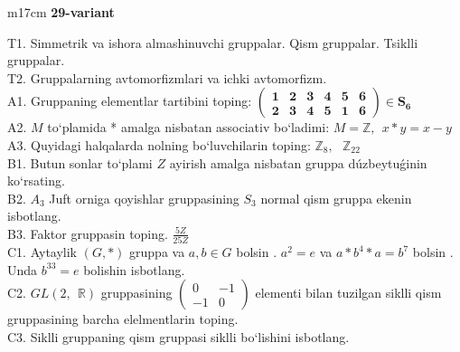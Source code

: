\documentclass{article}
\begin{document}
\begin{tabular}{m{17cm}}
\textbf{29-variant}
\newline

T1. Simmetrik va ishora almashinuvchi gruppalar. Qism gruppalar. Tsiklli gruppalar. \\
T2. Gruppalarning avtomorfizmlari va ichki avtomorfizm. \\
A1. Gruppaning elementlar tartibini toping: \(\begin{pmatrix}
\mathbf{1} & \mathbf{2} & \mathbf{3} & \mathbf{4} & \mathbf{5} & \mathbf{6} \\
\mathbf{2} & \mathbf{3} & \mathbf{4} & \mathbf{5} & \mathbf{1} & \mathbf{6}
\end{pmatrix}\mathbf{\in}\mathbf{S}_{\mathbf{6}}\) \\
A2. \(M\) to`plamida * amalga nisbatan associativ bo`ladimi: \(M\mathbb{= Z},\ \ x*y = x - y\) \\
A3. Quyidagi halqalarda nolning bo`luvchilarin toping: \(\mathbb{Z}_{8},\ \ \ \mathbb{Z}_{22}\) \\
B1. Butun sonlar to`plami \(Z\) ayirish amalga nisbatan gruppa dúzbeytuǵinin ko`rsating. \\
B2. \(A_{3}\) Juft orniga qoyishlar gruppasining \(S_{3}\) normal qism gruppa ekenin isbotlang. \\
B3. Faktor gruppasin toping. \(\frac{5Z}{25Z}\) \\
C1. Aytaylik \((G,*)\) gruppa va \(a,b \in G\) bo\textquotesingle lsin . \(a^{2} = e\) va \(a*b^{4}*a = b^{7}\) bo\textquotesingle lsin . Unda \(b^{33} = e\) bolishin isbotlang. \\
C2. \(GL(2,\mathbb{\ \ R})\) gruppasining \(\begin{pmatrix}
0 & - 1 \\
 - 1 & 0
\end{pmatrix}\) elementi bilan tuzilgan siklli qism gruppasining barcha elelmentlarin toping. \\
C3. Siklli gruppaning qism gruppasi siklli bo`lishini isbotlang. \\

\end{tabular}
\vspace{1cm}
\end{document}

